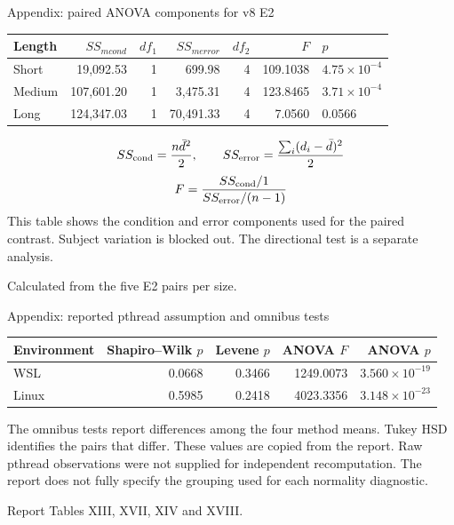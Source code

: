 \documentclass[aspectratio=169,11pt]{beamer}
\newcommand{\source}[1]{\par\vfill{\tiny\color{gray}#1\par}}
\begin{document}
\begin{frame}{Appendix: paired ANOVA components for v8 E2}
\scriptsize\centering
\begin{tabular}{lrrrrrl}\toprule
Length & $SS_{
m cond}$ & $df_1$ & $SS_{
m error}$ & $df_2$ & $F$ & $p$\\\midrule
Short & 19,092.53 & 1 & 699.98 & 4 & 109.1038 & $4.75\times10^{-4}$\\
Medium & 107,601.20 & 1 & 3,475.31 & 4 & 123.8465 & $3.71\times10^{-4}$\\
Long & 124,347.03 & 1 & 70,491.33 & 4 & 7.0560 & 0.0566\\
\bottomrule\end{tabular}\par
\medskip\raggedright\normalsize
\[SS_{\rm cond}=\frac{n\bar d^2}{2},\qquad SS_{\rm error}=\frac{\sum_i(d_i-\bar d)^2}{2}\]
\[F=\frac{SS_{\rm cond}/1}{SS_{\rm error}/(n-1)}\]
\small This table shows the condition and error components used for the paired contrast. Subject variation is blocked out. The directional test is a separate analysis.
\source{Calculated from the five E2 pairs per size.}
\end{frame}


\begin{frame}{Appendix: reported pthread assumption and omnibus tests}
\small\centering
\begin{tabular}{lrrrr}\toprule
Environment & Shapiro--Wilk $p$ & Levene $p$ & ANOVA $F$ & ANOVA $p$\\\midrule
WSL & 0.0668 & 0.3466 & 1249.0073 & $3.560\times10^{-19}$\\
Linux & 0.5985 & 0.2418 & 4023.3356 & $3.148\times10^{-23}$\\
\bottomrule\end{tabular}\par
\medskip\raggedright\normalsize The omnibus tests report differences among the four method means. Tukey HSD identifies the pairs that differ.
\medskip
\small These values are copied from the report. Raw pthread observations were not supplied for independent recomputation. The report does not fully specify the grouping used for each normality diagnostic.
\source{Report Tables XIII, XVII, XIV and XVIII.}
\end{frame}
\end{document}
